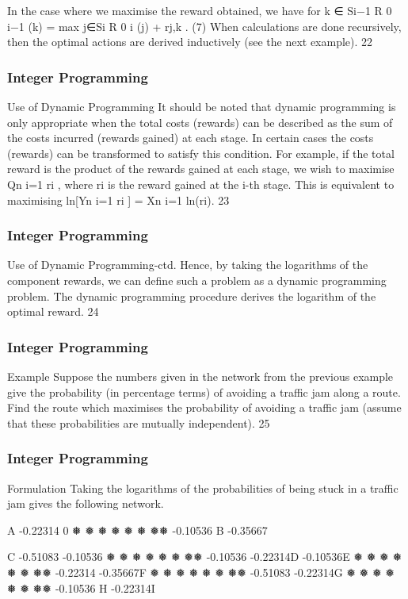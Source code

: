 \begin{frame}
In the case where we maximise the reward obtained, we have for
k ∈ Si−1
R
0
i−1
(k) = max
j∈Si
{R
0
i
(j) + rj,k }. (7)
When calculations are done recursively, then the optimal actions
are derived inductively (see the next example).
22 \end{frame}  \begin{frame} \frametitle{Integer Programming}     
Use of Dynamic Programming
It should be noted that dynamic programming is only appropriate
when the total costs (rewards) can be described as the sum of the
costs incurred (rewards gained) at each stage.
In certain cases the costs (rewards) can be transformed to satisfy
this condition. For example, if the total reward is the product of
the rewards gained at each stage, we wish to maximise Qn
i=1 ri
,
where ri
is the reward gained at the i-th stage.
This is equivalent to maximising
ln[Yn
i=1
ri
] = Xn
i=1
ln(ri).
23 \end{frame}  \begin{frame} \frametitle{Integer Programming}     
Use of Dynamic Programming-ctd.
Hence, by taking the logarithms of the component rewards, we can
define such a problem as a dynamic programming problem.
The dynamic programming procedure derives the logarithm of the
optimal reward.
24 \end{frame}  \begin{frame} \frametitle{Integer Programming}     
Example
Suppose the numbers given in the network from the previous
example give the probability (in percentage terms) of avoiding a
traffic jam along a route. Find the route which maximises the
probability of avoiding a traffic jam (assume that these
probabilities are mutually independent).
25 \end{frame}  \begin{frame} \frametitle{Integer Programming}     
Formulation
Taking the logarithms of the probabilities of being stuck in a traffic
jam gives the following network.







A
-0.22314
0
❅
❅
❅
❅
❅
❅
❅❅
-0.10536
B -0.35667







C
-0.51083
-0.10536
❅
❅
❅
❅
❅
❅
❅❅
-0.10536
-0.22314D
-0.10536E
❅
❅
❅
❅
❅
❅
❅❅
-0.22314
-0.35667F
❅
❅
❅
❅
❅
❅
❅❅
-0.51083
-0.22314G
❅
❅
❅
❅
❅
❅
❅❅
-0.10536
H
-0.22314I








\end{frame}
